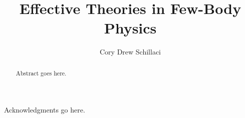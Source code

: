 \documentclass{ucbthesis}
\begin{document}

\title{Effective Theories in Few-Body Physics}
\author{Cory Drew Schillaci}


\maketitle
\approvalpage
\copyrightpage

\begin{abstract}
Abstract goes here.
\end{abstract}


\begin{frontmatter}



\tableofcontents
\clearpage
\listoffigures
\listoftables

\begin{acknowledgements}
Acknowledgments go here.

\end{acknowledgements}

\end{frontmatter}

\pagestyle{headings}










\appendix







\printbibliography
\end{document}
